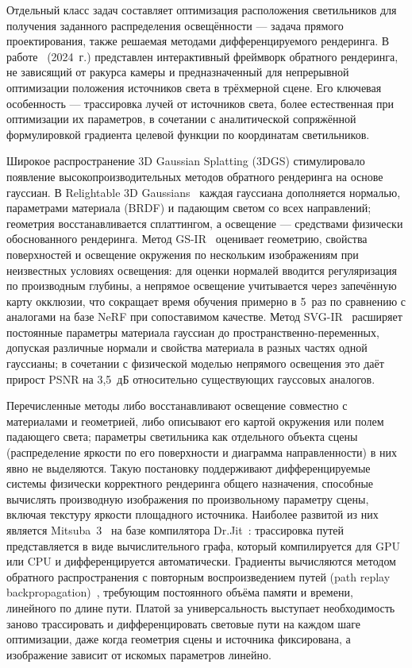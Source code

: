 Отдельный класс задач составляет оптимизация расположения светильников для
получения заданного распределения освещённости --- задача прямого
проектирования, также решаемая методами дифференцируемого рендеринга. В
работе~\cite{ALT2024} (2024~г.) представлен интерактивный фреймворк обратного
рендеринга, не зависящий от ракурса камеры и предназначенный для непрерывной
оптимизации положения источников света в трёхмерной сцене. Его ключевая
особенность --- трассировка лучей от источников света, более естественная при
оптимизации их параметров, в сочетании с аналитической сопряжённой формулировкой
градиента целевой функции по координатам светильников.

Широкое распространение 3D Gaussian Splatting (3DGS) стимулировало появление
высокопроизводительных методов обратного рендеринга на основе гауссиан. В
Relightable 3D Gaussians~\cite{R3DG2023} каждая гауссиана дополняется нормалью,
параметрами материала (BRDF) и падающим светом со всех направлений; геометрия
восстанавливается сплаттингом, а освещение --- средствами физически
обоснованного рендеринга. Метод GS-IR~\cite{GSIR2024} оценивает геометрию,
свойства поверхностей и освещение окружения по нескольким изображениям при
неизвестных условиях освещения: для оценки нормалей вводится регуляризация по
производным глубины, а непрямое освещение учитывается через запечённую карту
окклюзии, что сокращает время обучения примерно в 5~раз по сравнению с
аналогами на базе NeRF при сопоставимом качестве. Метод SVG-IR~\cite{SVGIR2025}
расширяет постоянные параметры материала гауссиан до пространственно-переменных,
допуская различные нормали и свойства материала в разных частях одной гауссианы;
в сочетании с физической моделью непрямого освещения это даёт прирост PSNR на
3,5~дБ относительно существующих гауссовых аналогов.

Перечисленные методы либо восстанавливают освещение совместно с материалами и
геометрией, либо описывают его картой окружения или полем падающего света;
параметры светильника как отдельного объекта сцены (распределение яркости по его
поверхности и диаграмма направленности) в них явно не выделяются. Такую
постановку поддерживают дифференцируемые системы физически корректного
рендеринга общего назначения, способные вычислять производную изображения по
произвольному параметру сцены, включая текстуру яркости площадного источника.
Наиболее развитой из них является Mitsuba~3~\cite{Mitsuba3} на базе компилятора
Dr.Jit~\cite{DrJit2022}: трассировка путей представляется в виде вычислительного
графа, который компилируется для GPU или CPU и дифференцируется автоматически.
Градиенты вычисляются методом обратного распространения с повторным
воспроизведением путей (path replay backpropagation)~\cite{PRB2021}, требующим
постоянного объёма памяти и времени, линейного по длине пути. Платой за
универсальность выступает необходимость заново трассировать и дифференцировать
световые пути на каждом шаге оптимизации, даже когда геометрия сцены и источника
фиксирована, а изображение зависит от искомых параметров линейно.

